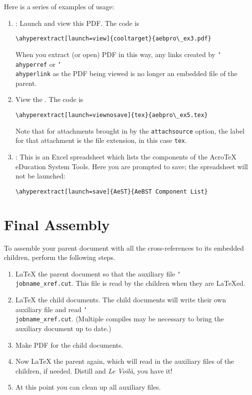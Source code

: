 \documentclass{article}
\newcommand{\cs}[1]{\texttt{\char`\\#1}}
\newcommand\newtopic{\par\ifdim\lastskip>0pt\relax\vskip-\lastskip\fi
\par\vskip6pt\noindent}
\begin{document}
\newtopic Here is a series of examples of usage:
\begin{enumerate}

\item {}: Launch
and view this PDF. The code is
\begin{verbatim}
\ahyperextract[launch=view]{cooltarget}{aebpro\_ex3.pdf}
\end{verbatim}
When you extract (or open) PDF in this way, any links created
by \cs{ahyperref} or \cs{ahyperlink} as the PDF being viewed is no longer an embedded file of the
parent.

\item View the . The code is
\begin{verbatim}
\ahyperextract[launch=viewnosave]{tex}{aebpro\_ex5.tex}
\end{verbatim}
Note that for attachments brought in by the \texttt{attachsource} option,
the label for that attachment is the file extension, in this case
\texttt{tex}.

\item {}: This is an Excel spreadsheet which lists
the components of the {Acro\negthinspace\TeX} eDucation System
Tools. Here you are prompted to save; the spreadsheet will not be launched:
\begin{verbatim}
\ahyperextract[launch=save]{AeST}{AeBST Component List}
\end{verbatim}
\end{enumerate}

\section{Final Assembly}

To assemble your parent document with all the cross-references to
its embedded children, perform the following steps.
\begin{enumerate}

\item {\LaTeX} the parent document so that the auxiliary file
    \cs{jobname\_xref.cut}. This file is read by the children when they
    are {\LaTeX}ed.

\item {\LaTeX} the child documents. The child documents will write
    their own auxiliary file and read \cs{jobname\_xref.cut}. (Multiple
    compiles may be necessary to bring the auxiliary document up to
    date.)

\item Make PDF for the child documents.

\item Now {\LaTeX} the parent again, which will read in the
    auxiliary files of the children, if needed. Distill and \textsl{Le
    Voil\`{a}}, you have it!

\item At this point you can clean up all auxiliary files.

\end{enumerate}
\end{document}
